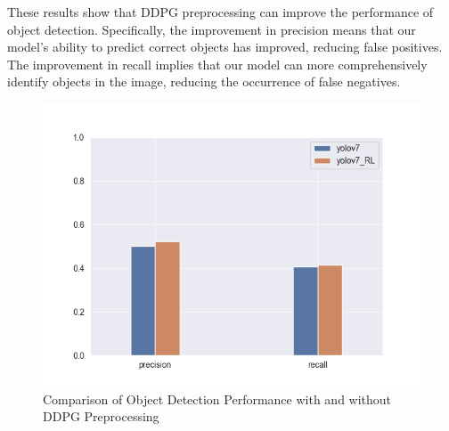 \documentclass[PhD]{PHlab-thesis}
\begin{document}
These results show that DDPG preprocessing can improve the performance of object detection. Specifically, the improvement in precision means that our model's ability to predict correct objects has improved, reducing false positives. The improvement in recall implies that our model can more comprehensively identify objects in the image, reducing the occurrence of false negatives.
\begin{figure}[H] 
    \centering 
    \includegraphics[width=\textwidth]{images/comparison result.png}
    \caption[Comparison Result]{Comparison of Object Detection Performance with and without DDPG Preprocessing} 
    \label{Fig.Comparison result} 
\end{figure}

\newpage
\end{document}
